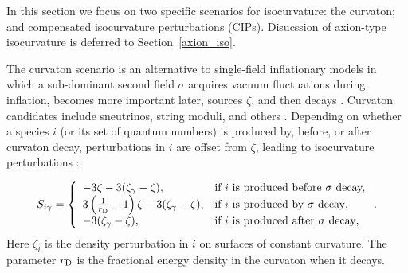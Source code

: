In this section we focus on two specific scenarios for isocurvature: the curvaton; and compensated isocurvature perturbations (CIPs). Disucssion of axion-type isocurvature is deferred to Section~\ref{axion_iso}.

The curvaton scenario is an alternative to single-field inflationary models in which a sub-dominant second field $\sigma$ acquires vacuum fluctuations during inflation, becomes more important later, sources $\zeta$, and then decays \cite{Mollerach:1989hu,Mukhanov:1990me,Moroi:2001ct,Lyth:2001nq,Lyth:2002my}. Curvaton candidates include sneutrinos, string moduli, and others \cite{Postma:2002et,Kasuya:2003va,Ikegami:2004ve,Mazumdar:2004qv,Allahverdi:2006dr,Papantonopoulos:2006xi,Mazumdar:2010sa,Mazumdar:2011xe}. Depending on whether a species $i$ (or its set of quantum numbers) is produced by, before, or after curvaton decay, perturbations in $i$ are offset from $\zeta$, leading to isocurvature perturbations \cite{Lyth:2001nq,Lyth:2002my,Gordon:2002gv}:

\begin{eqnarray}
S_{i \gamma}=\left\{\begin{array}{ll}-3\zeta-3(\zeta_{\gamma}-\zeta),&\mbox{if $i$ is produced before $\sigma$ decay,}\\3\left(\frac{1}{r_{\rm D}}-1\right)\zeta-3(\zeta_{\gamma}-\zeta),&\mbox{if $i$ is produced by $\sigma$ decay},\\ -3(\zeta_\gamma-\zeta),&\mbox{if $i$ is produced after $\sigma$ decay},\end{array}\right.\label{eq:strew}.
\end{eqnarray} Here $\zeta_{i}$ is the density perturbation in $i$ on surfaces of constant curvature. The parameter $r_{\rm D}$ is the fractional energy density in the curvaton when it decays. 

